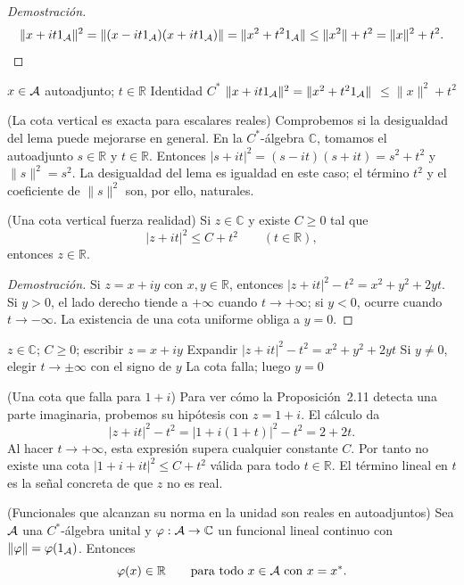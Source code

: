 \begin{proof}[Demostración]
\[
\|x+it1_\mathcal A\|^2
=\|(x-it1_\mathcal A)(x+it1_\mathcal A)\|
=\|x^2+t^2 1_\mathcal A\|
\le\|x^2\|+t^2
=\|x\|^2+t^2.
\]
\end{proof}

\proofdiagram
{$x\in\mathcal A$ autoadjunto; $t\in\mathbb R$}
{Identidad $C^*$}
{$\|x+it1_\mathcal A\|^2=\|x^2+t^2 1_\mathcal A\|$}
{$\le\|x\|^2+t^2$}

\begin{cthejemplo}{(La cota vertical es exacta para escalares reales)}
Comprobemos si la desigualdad del lema puede mejorarse en general.
En la $C^*$-álgebra $\mathbb C$, tomamos el autoadjunto
$s\in\mathbb R$ y $t\in\mathbb R$. Entonces
$|s+it|^2=(s-it)(s+it)=s^2+t^2$ y $\|s\|^2=s^2$.
La desigualdad del lema es igualdad en este caso; el término
$t^2$ y el coeficiente de $\|s\|^2$ son, por ello, naturales.
\end{cthejemplo}

\begin{cthproposicion}{(Una cota vertical fuerza realidad)}
Si $z\in\mathbb C$ y existe $C\ge0$ tal que
\[
 |z+it|^2\le C+t^2\qquad(t\in\mathbb R),
\]
entonces $z\in\mathbb R$.
\end{cthproposicion}

\begin{proof}[Demostración]
Si $z=x+iy$ con $x,y\in\mathbb R$, entonces
$|z+it|^2-t^2=x^2+y^2+2yt$. Si $y>0$, el lado derecho tiende a $+\infty$ cuando
$t\to+\infty$; si $y<0$, ocurre cuando $t\to-\infty$. La existencia de una cota uniforme obliga a
$y=0$.
\end{proof}

\proofdiagram
{$z\in\mathbb C$; $C\ge0$; escribir $z=x+iy$}
{Expandir $|z+it|^2-t^2=x^2+y^2+2yt$}
{Si $y\neq0$, elegir $t\to\pm\infty$ con el signo de $y$}
{La cota falla; luego $y=0$}

\begin{cthejemplo}{(Una cota que falla para $1+i$)}
Para ver cómo la Proposición~2.11 detecta una parte imaginaria, probemos su hipótesis con
$z=1+i$. El cálculo da
\[
 |z+it|^2-t^2=|1+i(1+t)|^2-t^2=2+2t.
\]
Al hacer $t\to+\infty$, esta expresión supera cualquier constante $C$. Por tanto no existe
una cota $|1+i+it|^2\le C+t^2$ válida para todo $t\in\mathbb R$.
El término lineal en $t$ es la señal concreta de que $z$ no es real.
\end{cthejemplo}

\begin{cthproposicion}{(Funcionales que alcanzan su norma en la unidad son reales en autoadjuntos)}
Sea $\mathcal A$ una $C^*$-álgebra unital y $\varphi:\mathcal A\to\mathbb C$ un funcional
lineal continuo con $\|\varphi\|=\varphi(1_\mathcal A)$. Entonces
\[
 \varphi(x)\in\mathbb R\qquad\text{para todo }x\in\mathcal A\text{ con }x=x^*.
\]
\end{cthproposicion}

